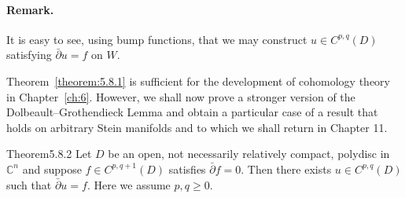 \paragraph{Remark.} It is easy to see, using bump functions, that we may construct $u\in C^{p,q}(D)$ satisfying $\bar\partial u=f$ on $W$.

Theorem~\ref{theorem:5.8.1} is sufficient for the development of cohomology theory in Chapter~\ref{ch:6}. However, we shall now prove a stronger version of the Dolbeault--Grothendieck Lemma and obtain a particular case of a result that holds on arbitrary Stein manifolds and to which we shall return in Chapter 11.
\begin{originaltheorem}{Theorem}{5.8.2}
Let $D$ be an open, not necessarily relatively compact, polydisc in $\mathbb C^n$ and suppose $f\in C^{p,q+1}(D)$ satisfies $\bar\partial f=0$. Then there exists $u\in C^{p,q}(D)$ such that $\bar\partial u=f$. Here we assume $p,q\geq0$.
\end{originaltheorem}
